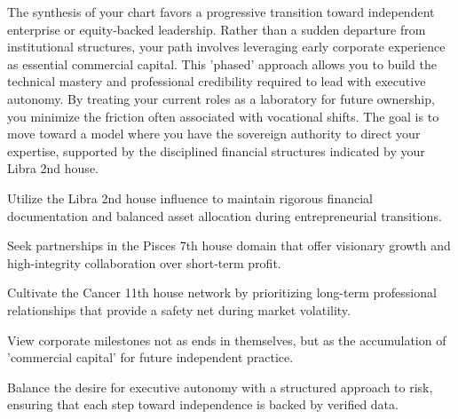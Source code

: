 {\fontsize{9}{13}\selectfont The synthesis of your chart favors a progressive transition toward independent enterprise or equity-backed leadership. Rather than a sudden departure from institutional structures, your path involves leveraging early corporate experience as essential commercial capital. This 'phased' approach allows you to build the technical mastery and professional credibility required to lead with executive autonomy. By treating your current roles as a laboratory for future ownership, you minimize the friction often associated with vocational shifts. The goal is to move toward a model where you have the sovereign authority to direct your expertise, supported by the disciplined financial structures indicated by your Libra 2nd house.}\par\vspace{1.8mm}

\begin{diamondlist}
  \item {\fontsize{8.5}{12}\selectfont Utilize the Libra 2nd house influence to maintain rigorous financial documentation and balanced asset allocation during entrepreneurial transitions.}
  \item {\fontsize{8.5}{12}\selectfont Seek partnerships in the Pisces 7th house domain that offer visionary growth and high-integrity collaboration over short-term profit.}
  \item {\fontsize{8.5}{12}\selectfont Cultivate the Cancer 11th house network by prioritizing long-term professional relationships that provide a safety net during market volatility.}
  \item {\fontsize{8.5}{12}\selectfont View corporate milestones not as ends in themselves, but as the accumulation of 'commercial capital' for future independent practice.}
  \item {\fontsize{8.5}{12}\selectfont Balance the desire for executive autonomy with a structured approach to risk, ensuring that each step toward independence is backed by verified data.}
\end{diamondlist}


\label{topic50}

